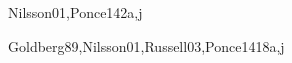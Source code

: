 \begin{syllabus}
\begin{unit}{\ISBasicSearchStrategies}{}{Nilsson01,Ponce14}{2}{a,j}
\begin{topics}
    \item \ISBasicSearchStrategiesTopicProblemSpaces
    \item \ISBasicSearchStrategiesTopicFactored
    \item \ISBasicSearchStrategiesTopicUninformed
    \item \ISBasicSearchStrategiesTopicHeuristics
    \item \ISBasicSearchStrategiesTopicSpace
    \item \ISBasicSearchStrategiesTopicTwo
    \item \ISBasicSearchStrategiesTopicConstraint
\end{topics}
\begin{learningoutcomes}
    \item \ISBasicSearchStrategiesLOFormulate [\Usage]
    \item \ISBasicSearchStrategiesLODescribeTheHeuristics [\Usage]
    \item \ISBasicSearchStrategiesLODescribeTheCombinatorial [\Usage]
    \item \ISBasicSearchStrategiesLOCompareAndSearch [\Usage]
\end{learningoutcomes}
\end{unit}

\begin{unit}{\ISAdvancedSearch}{}{Goldberg89,Nilsson01,Russell03,Ponce14}{18}{a,j}
\begin{topics}
    \item \ISAdvancedSearchTopicStochastic
    \item \ISAdvancedSearchTopicConstructing
    \item \ISAdvancedSearchTopicImplementation
    \item \ISAdvancedSearchTopicMinimax
    \item \ISAdvancedSearchTopicExpectimax
\end{topics}
\begin{learningoutcomes}
    \item \ISAdvancedSearchLODesignAndGenetic [\Usage]
    \item \ISAdvancedSearchLODesignAndSimulated [\Usage]
    \item \ISAdvancedSearchLODesignAndBeam [\Usage]
    \item \ISAdvancedSearchLOApplyMinimax [\Usage]
    \item \ISAdvancedSearchLOCompareAndAlgorithms [\Usage]
    \item \ISAdvancedSearchLOCompareAndHeuristic [\Usage]
\end{learningoutcomes}
\end{unit}


\end{syllabus}
